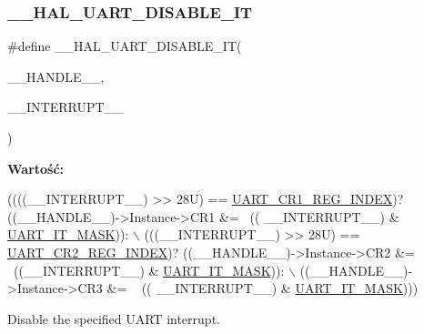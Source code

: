 \subsubsection{\texorpdfstring{\+\_\+\+\_\+\+H\+A\+L\+\_\+\+U\+A\+R\+T\+\_\+\+D\+I\+S\+A\+B\+L\+E\+\_\+\+IT}{\_\_HAL\_UART\_DISABLE\_IT}}
{\footnotesize\ttfamily \#define \+\_\+\+\_\+\+H\+A\+L\+\_\+\+U\+A\+R\+T\+\_\+\+D\+I\+S\+A\+B\+L\+E\+\_\+\+IT(\begin{DoxyParamCaption}\item[{}]{\+\_\+\+\_\+\+H\+A\+N\+D\+L\+E\+\_\+\+\_\+,  }\item[{}]{\+\_\+\+\_\+\+I\+N\+T\+E\+R\+R\+U\+P\+T\+\_\+\+\_\+ }\end{DoxyParamCaption})}

{\bfseries Wartość\+:}
\begin{DoxyCode}
((((\_\_INTERRUPT\_\_) >> 28U) == \hyperlink{group___u_a_r_t___private___constants_ga5917bcb19b2dab202b8cbfa82520b93e}{UART\_CR1\_REG\_INDEX})? ((\_\_HANDLE\_\_)->Instance->CR1 &= ~((
      \_\_INTERRUPT\_\_) & \hyperlink{group___u_a_r_t___private___constants_ga869439269c26e8dee93d49b1c7e67448}{UART\_IT\_MASK})): \(\backslash\)
                                                           (((\_\_INTERRUPT\_\_) >> 28U) == 
      \hyperlink{group___u_a_r_t___private___constants_ga3a8b0ee44c75493eb001e60a9876e586}{UART\_CR2\_REG\_INDEX})? ((\_\_HANDLE\_\_)->Instance->CR2 &= ~((\_\_INTERRUPT\_\_) & 
      \hyperlink{group___u_a_r_t___private___constants_ga869439269c26e8dee93d49b1c7e67448}{UART\_IT\_MASK})): \(\backslash\)
                                                           ((\_\_HANDLE\_\_)->Instance->CR3 &= ~ ((
      \_\_INTERRUPT\_\_) & \hyperlink{group___u_a_r_t___private___constants_ga869439269c26e8dee93d49b1c7e67448}{UART\_IT\_MASK})))
\end{DoxyCode}


Disable the specified U\+A\+RT interrupt. 


